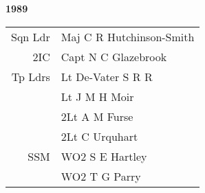 \begin{center}
  \Huge
  \textbf{1989}
\end{center}

\begin{center}
  \small
  \begin{tabular}{rl}
    Sqn Ldr & Maj C R Hutchinson-Smith \\
    2IC & Capt N C Glazebrook \\
    Tp Ldrs & Lt De-Vater S R R \\
      & Lt J M H Moir \\
      & 2Lt A M Furse \\
      & 2Lt C Urquhart \\
    SSM & WO2 S E Hartley \\
      & WO2 T G Parry \\
  \end{tabular}
\end{center}


